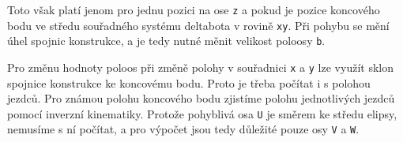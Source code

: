         

        
        Toto však platí jenom pro jednu pozici na ose \texttt{z} a pokud je pozice 
        koncového bodu ve středu souřadného systému deltabota v rovině \texttt{xy}. Při 
        pohybu se mění úhel spojnic konstrukce, a je tedy nutné měnit velikost poloosy 
        \texttt{b}. 
        
        Pro změnu hodnoty poloos při změně polohy v souřadnici \texttt{x} a \texttt{y} lze 
        využít sklon spojnice konstrukce ke koncovému bodu. Proto je třeba počítat i s
        polohou jezdců. Pro známou polohu koncového bodu zjistíme polohu jednotlivých 
        jezdců pomocí inverzní kinematiky. Protože pohyblivá osa \texttt{U} je směrem ke
        středu elipsy, nemusíme s ní počítat, a pro výpočet jsou tedy důležité pouze 
        osy \texttt{V} a  \texttt{W}.

